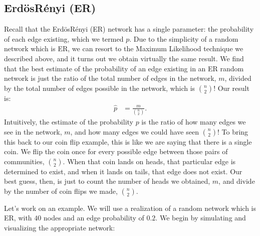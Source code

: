 \documentclass[letterpaper,10pt,english]{jupyterBook}
\begin{document}
\subsection{Erdös\sphinxhyphen{}Rényi (ER)}
\label{\detokenize{representations/ch6/estimating-parameters_mle:erdos-renyi-er}}
\sphinxAtStartPar
Recall that the Erdös\sphinxhyphen{}Rényi (ER) network has a single parameter: the probability of each edge existing, which we termed \(p\). Due to the simplicity of a random network which is ER, we can resort to the Maximum Likelihood technique we described above, and it turns out we obtain virtually the same result. We find that the best estimate of the probability of an edge existing in an ER random network is just the ratio of the total number of edges in the network, \(m\), divided by the total number of edges possible in the network, which is \(\binom n 2\)! Our result is:
\begin{align*}
    \hat p &= \frac{m}{\binom n 2}.
\end{align*}
\sphinxAtStartPar
Intuitively, the estimate of the probability \(p\) is the ratio of how many edges we see in the network, \(m\), and how many edges we could have seen \(\binom n 2\)! To bring this back to our coin flip example, this is like we are saying that there is a single coin. We flip the coin once for every possible edge between those pairs of communities, \(\binom n 2\). When that coin lands on heads, that particular edge is determined to exist, and when it lands on tails, that edge does not exist. Our best guess, then, is just to count the number of heads we obtained, \(m\), and divide by the number of coin flips we made, \(\binom n 2\).

\sphinxAtStartPar
Let’s work on an example. We will use a realization of a random network which is ER, with \(40\) nodes and an edge probability of \(0.2\). We begin by simulating and visualizing the appropriate network:

\begin{sphinxVerbatim}[commandchars=\\\{\}]
   
   

   

 
\end{sphinxVerbatim}
\end{document}
